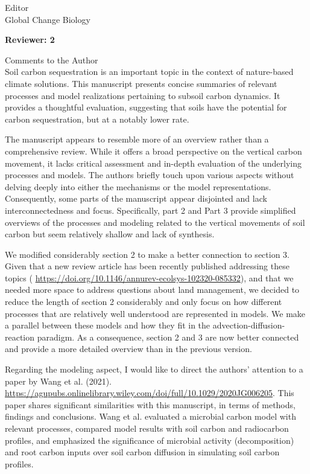 \documentclass[11pt]{bgcletter}
\newcommand{\answer}[1] {
{\color{cyan} #1}
}
\begin{document}
\begin{letter}{Editor\\
   Global Change Biology
}
\newpage

\textbf{Reviewer: 2}

Comments to the Author \\
Soil carbon sequestration is an important topic in the context of nature-based climate solutions. This manuscript presents concise summaries of relevant processes and model realizations pertaining to subsoil carbon dynamics. It provides a thoughtful evaluation, suggesting that soils have the potential for carbon sequestration, but at a notably lower rate.

The manuscript appears to resemble more of an overview rather than a comprehensive review. While it offers a broad perspective on the vertical carbon movement, it lacks critical assessment and in-depth evaluation of the underlying processes and models. The authors briefly touch upon various aspects without delving deeply into either the mechanisms or the model representations. Consequently, some parts of the manuscript appear disjointed and lack interconnectedness and focus. Specifically, part 2 and Part 3 provide simplified overviews of the processes and modeling related to the vertical movements of soil carbon but seem relatively shallow and lack of synthesis. 

\answer{We modified considerably section 2 to make a better connection to section 3. Given that a new review article has been recently published addressing these topics ( \url{https://doi.org/10.1146/annurev-ecolsys-102320-085332}), and that we needed more space to address questions about land management, we decided to reduce the length of section 2 considerably and only focus on how different processes that are relatively well understood are represented in models. We make a parallel between these models and how they fit in the advection-diffusion-reaction paradigm. As a consequence, section 2 and 3 are now better connected and provide a more detailed overview than in the previous version. }

Regarding the modeling aspect, I would like to direct the authors' attention to a paper by Wang et al. (2021). 
\url{https://agupubs.onlinelibrary.wiley.com/doi/full/10.1029/2020JG006205}. This paper shares significant similarities with this manuscript, in terms of methods, findings and conclusions. Wang et al. evaluated a microbial carbon model with relevant processes, compared model results with soil carbon and radiocarbon profiles, and emphasized the significance of microbial activity (decomposition) and root carbon inputs over soil carbon diffusion in simulating soil carbon profiles.


\end{letter}
\end{document}
